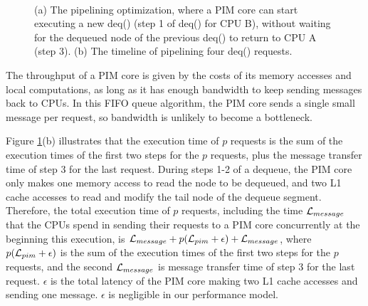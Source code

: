 \begin{figure}[ht!]
\centering
{}
\\

\caption{(a) The pipelining optimization, where a PIM core can start executing 
a new deq() (step 1 of deq() for CPU B), without waiting for the dequeued node of 
the previous deq() to return to CPU A (step 3). 
(b) The timeline of pipelining four deq() requests.}
\label{figure:queue_pipeline}
\end{figure}
 
The throughput of a PIM core is given by the costs of its memory accesses and local computations, 
as long as it has enough bandwidth to keep sending messages back to CPUs.  
In this FIFO queue algorithm, the PIM core sends a single small message per request, 
so bandwidth is unlikely to become a bottleneck. 

Figure \ref{figure:queue_pipeline}(b) illustrates that 
the execution time of $p$ requests is the sum of the execution times of the first two steps 
for the $p$ requests, plus the message transfer time of step 3 for the last request.   
During steps 1-2 of a dequeue, the PIM core only makes one memory access to read the node 
to be dequeued, and two L1 cache accesses to read and modify the tail node of the dequeue segment.   
Therefore, the total execution time of $p$ requests, 
including the time $\mathcal{L}_{message}$ that the CPUs spend in sending their requests to a PIM core concurrently at the beginning this execution, 
is $\mathcal{L}_{message} + p(\mathcal{L}_{pim} + \epsilon) + \mathcal{L}_{message}$, 
where $p(\mathcal{L}_{pim} + \epsilon)$ is the sum of the execution times of the first two steps 
for the $p$ requests, and the second $\mathcal{L}_{message}$ is message transfer time of step 3 for the last request. 
$\epsilon$ is the total latency of the PIM core making two L1 cache accesses and sending one message.  
$\epsilon$ is negligible in our performance model. 

